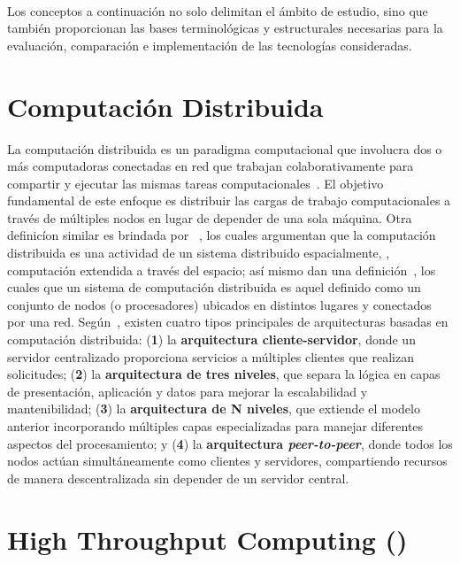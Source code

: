 \label{cap:marcoConceptual}
\mbox{}\\

\noindent
Los conceptos a continuación no solo delimitan el ámbito de estudio, sino que también proporcionan las bases terminológicas y estructurales necesarias para la evaluación, comparación e implementación de las tecnologías consideradas.

\noindent
\section{Computación Distribuida}
La computación distribuida es un paradigma computacional que involucra dos o más computadoras conectadas en red que trabajan colaborativamente para compartir y ejecutar las mismas tareas computacionales~\citep{Ali2015}. El objetivo fundamental de este enfoque es distribuir las cargas de trabajo computacionales a través de múltiples nodos en lugar de depender de una sola máquina. Otra definicíon similar es brindada por ~\cite{Lamport1990}, los cuales argumentan que la computación distribuida es una actividad  de un sistema distribuido espacialmente, \ie, computación extendida a través del espacio; así mismo dan una definición~\cite{Chang1995}, los cuales  que un sistema de computación distribuida es aquel definido como un conjunto de nodos (o procesadores) ubicados en distintos lugares y conectados por una red. Según~\cite{AWS01}, existen cuatro tipos principales de arquitecturas basadas en computación distribuida: (\textbf{1}) la \textbf{arquitectura cliente-servidor}, donde un servidor centralizado proporciona servicios a múltiples clientes que realizan solicitudes; (\textbf{2}) la \textbf{arquitectura de tres niveles}, que separa la lógica en capas de presentación, aplicación y datos para mejorar la escalabilidad y mantenibilidad; (\textbf{3}) la \textbf{arquitectura de N niveles}, que extiende el modelo anterior incorporando múltiples capas especializadas para manejar diferentes aspectos del procesamiento; y (\textbf{4}) la \textbf{arquitectura \textit{peer-to-peer}}, donde todos los nodos actúan simultáneamente como clientes y servidores, compartiendo recursos de manera descentralizada sin depender de un servidor central.

\section{High Throughput Computing (\HTC)}

